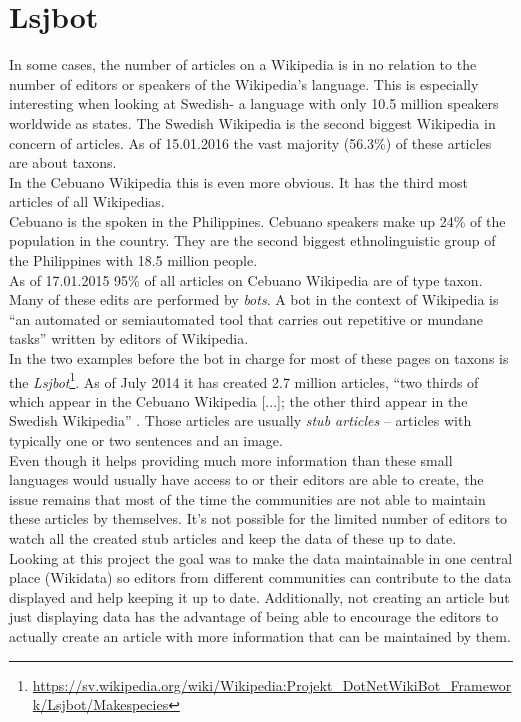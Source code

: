 \section{Lsjbot}
In some cases, the number of articles on a Wikipedia is in no relation to the number of editors or speakers of the Wikipedia's language. This is especially interesting when looking at Swedish- a language with only 10.5 million speakers worldwide as \citet{nlpd:01} states. The Swedish Wikipedia is the second biggest Wikipedia in concern of articles. As of 15.01.2016 the vast majority (56.3\%) of these articles are about taxons. \\
In the Cebuano Wikipedia this is even more obvious. It has the third most articles of all Wikipedias. \\
Cebuano is the spoken in the Philippines. Cebuano speakers make up 24\% of the population in the country. \citep{cebuano:01} They are the second biggest ethnolinguistic group of the Philippines with 18.5 million people. \citep{cebuano:02} \\
As of 17.01.2015 95\% of all articles on Cebuano Wikipedia are of type taxon. \citep{wiki:07} \\
Many of these edits are performed by \textit{bots}. A bot in the context of Wikipedia is ``an automated or semiautomated tool that carries out repetitive or mundane tasks'' \citep{wiki:08} written by editors of Wikipedia. \\
In the two examples before the bot in charge for most of these pages on taxons is the \textit{Lsjbot}\footnote{\url{https://sv.wikipedia.org/wiki/Wikipedia:Projekt_DotNetWikiBot_Framework/Lsjbot/Makespecies}}. As of July 2014 it has created 2.7 million articles, ``two thirds of which appear in the Cebuano Wikipedia [...]; the other third appear in the Swedish Wikipedia'' \citep{wiki:09}. Those articles are usually \textit{stub articles} -- articles with typically one or two sentences and an image. \\
Even though it helps providing much more information than these small languages would usually have access to or their editors are able to create, the issue remains that most of the time the communities are not able to maintain these articles by themselves. It's not possible for the limited number of editors to watch all the created stub articles and keep the data of these up to date. \\
Looking at this project the goal was to make the data maintainable in one central place (Wikidata) so editors from different communities can contribute to the data displayed and help keeping it up to date. Additionally, not creating an article but just displaying data has the advantage of being able to encourage the editors to actually create an article with more information that can be maintained by them.

